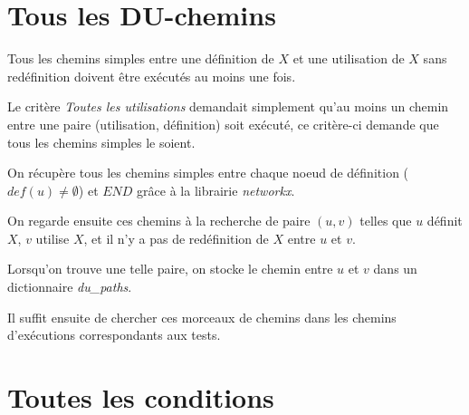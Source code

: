 \section{Tous les DU-chemins}

Tous les chemins simples entre une définition de $X$ et une utilisation de $X$ sans redéfinition doivent être exécutés au moins une fois.

Le critère \textit{Toutes les utilisations} demandait simplement qu'au moins un chemin entre une paire (utilisation, définition) soit exécuté, ce critère-ci demande que tous les chemins simples le soient.

On récupère tous les chemins simples entre chaque noeud de définition ($def(u) \neq \emptyset$) et $END$ grâce à la librairie \textit{networkx}.

On regarde ensuite ces chemins à la recherche de paire $(u, v)$ telles que $u$ définit $X$, $v$ utilise $X$, et il n'y a pas de redéfinition de $X$ entre $u$ et $v$.

Lorsqu'on trouve une telle paire, on stocke le chemin entre $u$ et $v$ dans un dictionnaire \textit{du\_paths}.

Il suffit ensuite de chercher ces morceaux de chemins dans les chemins d'exécutions correspondants aux tests.
\section{Toutes les conditions}
